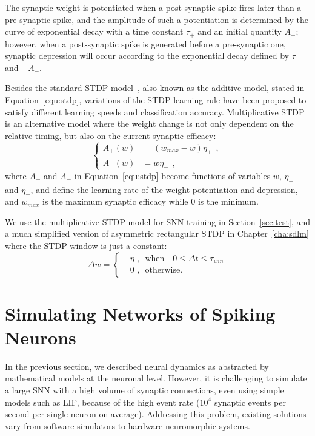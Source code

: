 The synaptic weight is potentiated when a post-synaptic spike fires later than a pre-synaptic spike, and the amplitude of such a potentiation is determined by the curve of exponential decay with a time constant $\tau_+$ and an initial quantity $A_+$;
however, when a post-synaptic spike is generated before a pre-synaptic one, synaptic depression will occur according to the exponential decay defined by $\tau_-$ and ${-A}_-$.

Besides the standard STDP model~\citep{song2000competitive}, also known as the additive model, stated in Equation~\ref{equ:stdp}, variations of the STDP learning rule have been proposed to satisfy different learning speeds and classification accuracy.
Multiplicative STDP~\citep{morrison2008phenomenological} is an alternative model where the weight change is not only dependent on the relative timing, but also on the current synaptic efficacy:
\begin{equation}
\left\{
\begin{aligned}
A_+ (w) &=  (w_{max} - w)\eta_+~~, \\
A_- (w) &= w\eta_-~~,
\end{aligned}
\right.
\end{equation}
where $A_+$ and $A_-$ in Equation~\ref{equ:stdp} become functions of variables $w$, $\eta_+$ and $\eta_-$, and define the learning rate of the weight potentiation and depression, and $w_{max}$ is the maximum synaptic efficacy while 0 is the minimum.

We use the multiplicative STDP model for SNN training in Section~\ref{sec:test}, and a much simplified version of asymmetric rectangular STDP in Chapter~\ref{cha:sdlm} where the STDP window is just a constant:
\begin{equation}
\Delta w = \left\{
\begin{aligned}
&\eta \textrm{~,~~when~~~} 0 \leq \Delta  t \leq \tau_{win}\\
& 0 \textrm{~,~~otherwise}.
\end{aligned}
\right.
\end{equation}

\section{Simulating Networks of Spiking Neurons}
\label{sec:snn_sim}
In the previous section, we described neural dynamics as abstracted by mathematical models at the neuronal level.
However, it is challenging to simulate a large SNN with a high volume of synaptic connections, even using simple models such as LIF, because of the high event rate ($10^4$ synaptic events per second per single neuron on average).
Addressing this problem, existing solutions vary from software simulators to hardware neuromorphic systems.

